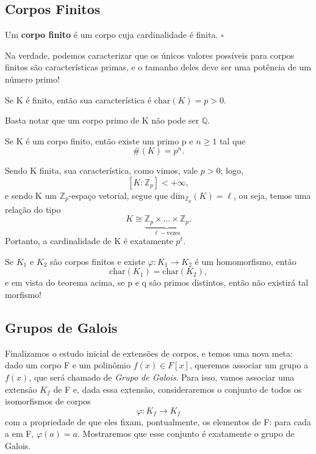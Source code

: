 \documentclass[../algebraIII_notes.tex]{subfiles}
\begin{document}
\subsection{Corpos Finitos}
\begin{def*}
	Um \textbf{corpo finito} é um corpo cuja cardinalidade é finita. \(\square\)
\end{def*}
Na verdade, podemos caracterizar que os únicos valores possíveis para corpos finitos são características primas, e o tamanho deles deve ser uma potência de um número primo!
\begin{lemma*}
	Se K é finito, então sua característica é \(\mathrm{char}(K)=p>0\).
\end{lemma*}
\begin{proof*}
	Basta notar que um corpo primo de K não pode ser \(\mathbb{Q}\). \qedsymbol
\end{proof*}
\begin{theorem*}
	Se K é um corpo finito, então existe um primo p e \(n\geq 1\) tal que
	\[
		\#(K)=p^{n}.
	\]
\end{theorem*}
\begin{proof*}
	Sendo K finita, sua característica, como vimos, vale \(p>0\); logo,
	\[
		[K:\mathbb{Z}_{p}]<+\infty,
	\]
	e sendo K um \(\mathbb{Z}_{p}\)-espaço vetorial, segue que \(\mathrm{dim}_{\mathbb{Z}_{p}}(K)=\ell \), ou seja, temos uma relação do tipo
	\[
		K\cong \underbrace{\mathbb{Z}_{p}\times \dotsc \times \mathbb{Z}_{p}}_{\ell-\text{vezes}}.
	\]
	Portanto, a cardinalidade de K é exatamente \(p^{\ell }\). \qedsymbol
\end{proof*}
\begin{tcolorbox}[
		skin=enhanced,
		title=Observação,
		fonttitle=\bfseries,
		colframe=black,
		colbacktitle=cyan!75!white,
		colback=cyan!15,
		colbacklower=black,
		coltitle=black,
		drop fuzzy shadow,
	]
	Se \(K_1\) e \(K_2\) são corpos finitos e existe \(\varphi :K_1\rightarrow K_2\) é um homomorfismo, então
	\[
		\mathrm{char}(K_1)=\mathrm{char}(K_2),
	\]
	e em vista do teorema acima, se p e q são primos distintos, então não existirá tal morfismo!
\end{tcolorbox}

\subsection{Grupos de Galois}
Finalizamos o estudo inicial de extensões de corpos, e temos uma nova meta: dado um corpo F e um polinômio \(f(x)\in F[x]\), queremos associar um grupo a \(f(x)\), que será chamado de \textit{Grupo de Galois}. Para isso, vamos associar uma extensão \(K_{f}\) de F e, dada essa extensão, consideraremos o conjunto de todos os isomorfismos de corpos
\[
	\varphi :K_{f}\rightarrow K_{f}
\]
com a propriedade de que eles fixam, pontualmente, os elementos de F: para cada a em F, \(\varphi (a)=a\). Mostraremos que esse conjunto é exatamente o grupo de Galois.
\end{document}
